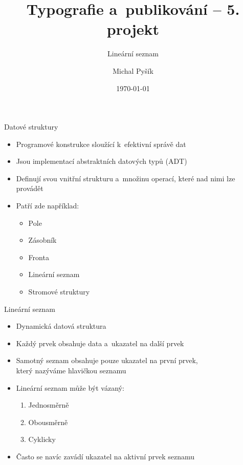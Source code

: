 \documentclass[10pt, hyperref={unicode}]{beamer}
\title{Typografie a~publikování -- 5. projekt}
\subtitle{Lineární seznam}
\author{Michal Pyšík}
\date{\today}
\institute{Vysoké učení technické v~Brně\\ Fakulta informačních technologií}
\begin{document}
\begin{frame}
\maketitle
\end{frame}


\begin{frame}{Datové struktury}
\begin{itemize}
    \item Programové konstrukce sloužící k~efektivní správě dat
    \item Jsou implementací abstraktních datových typů (ADT)
    \item Definují svou vnitřní strukturu a~množinu operací, které nad nimi lze provádět
    \item Patří zde například:
        \begin{itemize}
            \item Pole
            \item Zásobník
            \item Fronta
            \item \alert{Lineární seznam}
            \item Stromové struktury
        \end{itemize}
\end{itemize}
\end{frame}


\begin{frame}{Lineární seznam}
\begin{itemize}
    \item Dynamická datová struktura
    \item Každý prvek obsahuje data a~ukazatel na další prvek
    \item Samotný seznam obsahuje pouze ukazatel na první prvek,\\
            který nazýváme hlavičkou seznamu
    \item Lineární seznam může být vázaný:
    \begin{enumerate}
        \item \alert{Jednosměrně}
        \item Obousměrně
        \item Cyklicky
    \end{enumerate}
    \item Často se navíc zavádí ukazatel na aktivní prvek seznamu
\end{itemize}
\end{frame}
\end{document}
